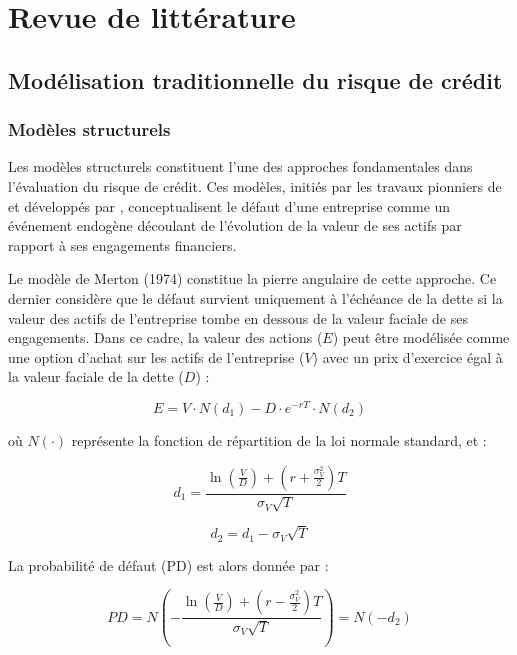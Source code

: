 \chapter{Revue de littérature}

\section{Modélisation traditionnelle du risque de crédit}

\subsection{Modèles structurels}

Les modèles structurels constituent l'une des approches fondamentales dans l'évaluation du risque de crédit. Ces modèles, initiés par les travaux pionniers de \citet{black1973} et développés par \citet{merton1974}, conceptualisent le défaut d'une entreprise comme un événement endogène découlant de l'évolution de la valeur de ses actifs par rapport à ses engagements financiers.

Le modèle de Merton (1974) constitue la pierre angulaire de cette approche. Ce dernier considère que le défaut survient uniquement à l'échéance de la dette si la valeur des actifs de l'entreprise tombe en dessous de la valeur faciale de ses engagements. Dans ce cadre, la valeur des actions ($E$) peut être modélisée comme une option d'achat sur les actifs de l'entreprise ($V$) avec un prix d'exercice égal à la valeur faciale de la dette ($D$) :

\begin{equation}
E = V \cdot N(d_1) - D \cdot e^{-rT} \cdot N(d_2)
\end{equation}

où $N(\cdot)$ représente la fonction de répartition de la loi normale standard, et :

\begin{equation}
d_1 = \frac{\ln(\frac{V}{D}) + (r + \frac{\sigma_V^2}{2})T}{\sigma_V\sqrt{T}}
\end{equation}

\begin{equation}
d_2 = d_1 - \sigma_V\sqrt{T}
\end{equation}

La probabilité de défaut (PD) est alors donnée par :

\begin{equation}
PD = N\left(-\frac{\ln(\frac{V}{D}) + (r - \frac{\sigma_V^2}{2})T}{\sigma_V\sqrt{T}}\right) = N(-d_2)
\end{equation}

